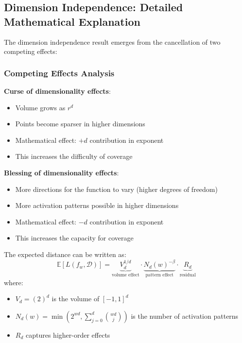 \subsection{Dimension Independence: Detailed Mathematical Explanation}
\label{subsec:dimension-independence-detailed}

The dimension independence result emerges from the cancellation of two competing effects:

\subsubsection{Competing Effects Analysis}

\textbf{Curse of dimensionality effects}:
\begin{itemize}
    \item Volume grows as $r^d$
    \item Points become sparser in higher dimensions
    \item Mathematical effect: $+d$ contribution in exponent
    \item This increases the difficulty of coverage
\end{itemize}

\textbf{Blessing of dimensionality effects}:
\begin{itemize}
    \item More directions for the function to vary (higher degrees of freedom)
    \item More activation patterns possible in higher dimensions
    \item Mathematical effect: $-d$ contribution in exponent  
    \item This increases the capacity for coverage
\end{itemize}

\begin{lemma}
The expected distance can be written as:
$$\mathbb{E}[L(f_w, \mathcal{D})] = \underbrace{V_d^{1/d}}_{\text{volume effect}} \cdot \underbrace{N_d(w)^{-\beta}}_{\text{pattern effect}} \cdot \underbrace{R_d}_{\text{residual}}$$
where:
\begin{itemize}
    \item $V_d = (2)^d$ is the volume of $[-1,1]^d$
    \item $N_d(w) = \min(2^{wd}, \sum_{j=0}^d \binom{wd}{j})$ is the number of activation patterns
    \item $R_d$ captures higher-order effects
\end{itemize}
\end{lemma}

